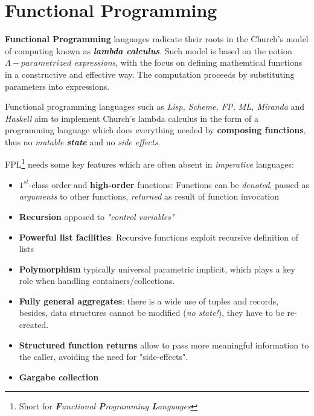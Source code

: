 \chapter{Functional Programming}
\textbf{Functional Programming} languages radicate their roots in the Church's model of computing known as \textbf{\textit{lambda calculus}}.
Such model is based on the notion $\Lambda-\textit{parametrized}$ \textit{expressions},
with the focus on defining mathemtical functions in a constructive and effective way.
The computation proceeds by substituting parameters into expressions.\nl

Functional programming languages such as \textit{Lisp, Scheme, FP, ML, Miranda} and \textit{Haskell} aim to implement Church's lambda calculus in the form of a programming language which does everything needed by \textbf{composing functions}, thus no \textit{mutable \textbf{state}} and no \textit{side effects}.

FPL\footnote{Short for \textit{\textbf{F}unctional \textbf{P}rogramming \textbf{L}anguages}} needs some key features which are often absent in \textit{imperative} languages:
\begin{itemize}
   \item $1^{st}$-class order and \textbf{high-order} functions:
   Functions can be \textit{denoted}, passed as \textit{arguments} to other functions, \textit{returned} as result of function invocation
   \item \textbf{Recursion} opposed to \textit{"control variables"}
   \item \textbf{Powerful list facilities}: Recursive functions exploit recursive definition of lists
   \item \textbf{Polymorphism} typically universal parametric
   implicit, 
   which plays a key role when handling containers/collections.
   \item \textbf{Fully general aggregates}:
   there is a wide use of tuples and records,
   besides,
   data structures cannot be modified (\textit{no state!}), they have to be re-created.
   \item \textbf{Structured function returns} allow to pass more meaningful information to the caller, avoiding the need for "side-effects".
   \item \textbf{Gargabe collection}
\end{itemize}